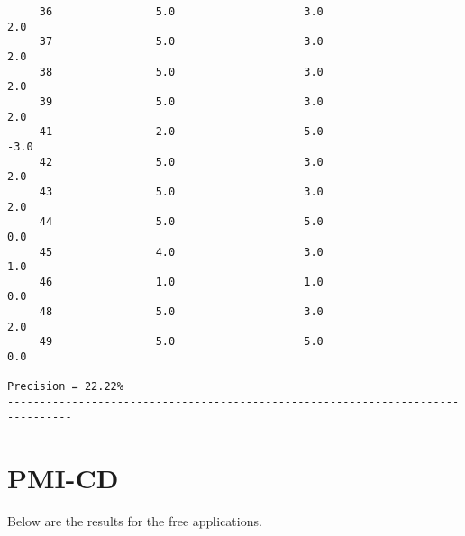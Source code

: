 \documentclass[11pt]{report} %
\begin{document}
\begin{verbatim}
     36                5.0                    3.0                    2.0
     37                5.0                    3.0                    2.0
     38                5.0                    3.0                    2.0
     39                5.0                    3.0                    2.0
     41                2.0                    5.0                   -3.0
     42                5.0                    3.0                    2.0
     43                5.0                    3.0                    2.0
     44                5.0                    5.0                    0.0
     45                4.0                    3.0                    1.0
     46                1.0                    1.0                    0.0
     48                5.0                    3.0                    2.0
     49                5.0                    5.0                    0.0

Precision = 22.22%
--------------------------------------------------------------------------------

\end{verbatim}

	\section{PMI-CD}

Below are the results for the free applications.
\end{document}
